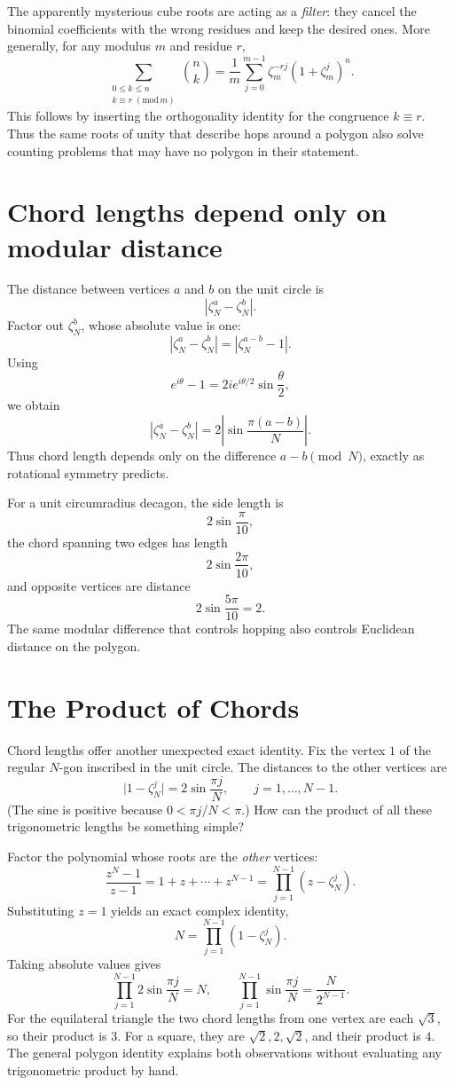 The apparently mysterious cube roots are acting as a \emph{filter}: they cancel the binomial coefficients with the wrong residues and keep the desired ones. More generally, for any modulus $m$ and residue $r$,
\[
 \boxed{\sum_{\substack{0\le k\le n\\k\equiv r\;(\mathrm{mod}\,m)}}
     \binom nk
 =\frac1m\sum_{j=0}^{m-1}
      \zeta_m^{-rj}(1+\zeta_m^j)^n.}
\]
This follows by inserting the orthogonality identity for the congruence $k\equiv r$. Thus the same roots of unity that describe hops around a polygon also solve counting problems that may have no polygon in their statement.

\section{Chord lengths depend only on modular distance}

The distance between vertices \(a\) and \(b\) on the unit circle is
\[
  |\zeta_N^a-\zeta_N^b|.
\]
Factor out \(\zeta_N^b\), whose absolute value is one:
\[
  |\zeta_N^a-\zeta_N^b|
  =|\zeta_N^{a-b}-1|.
\]
Using
\[
  e^{i\theta}-1
  =2i e^{i\theta/2}\sin\frac\theta2,
\]
we obtain
\[
  \boxed{
  |\zeta_N^a-\zeta_N^b|
  =2\left|\sin\frac{\pi(a-b)}{N}\right|.}
\]
Thus chord length depends only on the difference \(a-b\pmod N\), exactly as rotational symmetry predicts.

For a unit circumradius decagon, the side length is
\[
  2\sin\frac{\pi}{10},
\]
the chord spanning two edges has length
\[
  2\sin\frac{2\pi}{10},
\]
and opposite vertices are distance
\[
  2\sin\frac{5\pi}{10}=2.
\]
The same modular difference that controls hopping also controls Euclidean distance on the polygon.

\section{The Product of Chords}

Chord lengths offer another unexpected exact identity. Fix the vertex $1$ of the regular $N$-gon inscribed in the unit circle. The distances to the other vertices are
\[
 \bigl|1-\zeta_N^j\bigr|
 =2\sin\frac{\pi j}{N},
 \qquad j=1,\ldots,N-1.
\]
(The sine is positive because $0<\pi j/N<\pi$.) How can the product of all these trigonometric lengths be something simple?

Factor the polynomial whose roots are the \emph{other} vertices:
\[
 \frac{z^N-1}{z-1}
 =1+z+\cdots+z^{N-1}
 =\prod_{j=1}^{N-1}(z-\zeta_N^j).
\]
Substituting $z=1$ yields an exact complex identity,
\[
 N=\prod_{j=1}^{N-1}(1-\zeta_N^j).
\]
Taking absolute values gives
\[
 \boxed{\prod_{j=1}^{N-1}
           2\sin\frac{\pi j}{N}=N,}
 \qquad
 \boxed{\prod_{j=1}^{N-1}
           \sin\frac{\pi j}{N}
        =\frac{N}{2^{N-1}}.}
\]
For the equilateral triangle the two chord lengths from one vertex are each $\sqrt3$, so their product is $3$. For a square, they are $\sqrt2,2,\sqrt2$, and their product is $4$. The general polygon identity explains both observations without evaluating any trigonometric product by hand.

